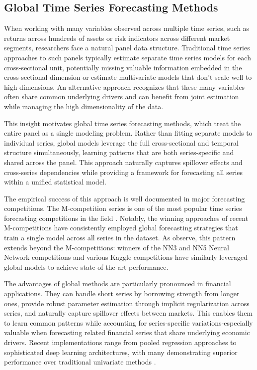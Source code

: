 \documentclass{article}
\begin{document}
\subsection{Global Time Series Forecasting Methods}

When working with many variables observed across multiple time series, such as returns across hundreds of assets or risk indicators across different market segments, researchers face a natural panel data structure. Traditional time series approaches to such panels typically estimate separate time series models for each cross-sectional unit, potentially missing valuable information embedded in the cross-sectional dimension or estimate multivariate models that don't scale well to high dimensions. An alternative approach recognizes that these many variables often share common underlying drivers and can benefit from joint estimation while managing the high dimensionality of the data.

This insight motivates global time series forecasting methods, which treat the entire panel as a single modeling problem. Rather than fitting separate models to individual series, global models leverage the full cross-sectional and temporal structure simultaneously, learning patterns that are both series-specific and shared across the panel. This approach naturally captures spillover effects and cross-series dependencies while providing a framework for forecasting all series within a unified statistical model.

The empirical success of this approach is well documented in major forecasting competitions. The M-competition series is one of the most popular time series forecasting competitions in the field \citep{Makridakis1982, Makridakis2000, Makridakis2018, Makridakis2022}. Notably, the winning approaches of recent M-competitions have consistently employed global forecasting strategies that train a single model across all series in the dataset. As \citet{Godahewa2021} observe, this pattern extends beyond the M-competitions: winners of the NN3 and NN5 Neural Network competitions and various Kaggle competitions have similarly leveraged global models to achieve state-of-the-art performance.

The advantages of global methods are particularly pronounced in financial applications. They can handle short series by borrowing strength from longer ones, provide robust parameter estimation through implicit regularization across series, and naturally capture spillover effects between markets. This enables them to learn common patterns while accounting for series-specific variations-especially valuable when forecasting related financial series that share underlying economic drivers. Recent implementations range from pooled regression approaches to sophisticated deep learning architectures, with many demonstrating superior performance over traditional univariate methods \citep{Godahewa2021}.
\end{document}
